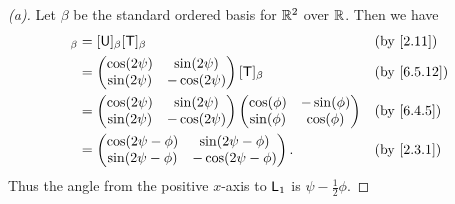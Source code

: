 \begin{proof}[(a)]
  Let \(\beta\) be the standard ordered basis for \(\mathbb{R}^2\) over \(\mathbb{R}\).
  Then we have
  \begin{align*}
    [\U \T]_{\beta} & = [\U]_{\beta} [\T]_{\beta}                   &  & \by{2.11} \\
                    & = \begin{pmatrix}
                          \cos(2 \psi) & \sin(2 \psi)  \\
                          \sin(2 \psi) & -\cos(2 \psi)
                        \end{pmatrix} [\T]_{\beta}               &  & \by{6.5.12}  \\
                    & = \begin{pmatrix}
                          \cos(2 \psi) & \sin(2 \psi)  \\
                          \sin(2 \psi) & -\cos(2 \psi)
                        \end{pmatrix} \begin{pmatrix}
                                        \cos(\phi) & -\sin(\phi) \\
                                        \sin(\phi) & \cos(\phi)
                                      \end{pmatrix}               &  & \by{6.4.5}  \\
                    & = \begin{pmatrix}
                          \cos(2 \psi - \phi) & \sin(2 \psi - \phi)  \\
                          \sin(2 \psi - \phi) & -\cos(2 \psi - \phi)
                        \end{pmatrix}. &  & \by{2.3.1}
  \end{align*}
  Thus the angle from the positive \(x\)-axis to \(\mathsf{L}_1\) is \(\psi - \frac{1}{2} \phi\).
\end{proof}

